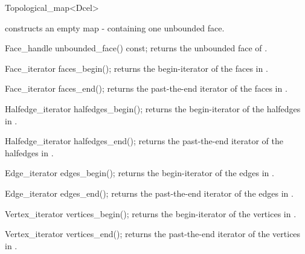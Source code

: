 \begin{ccRefClass}{Topological_map<Dcel>}
    \ccGlue
    \ccGlue    
    \ccGlue    
    
\ccCreation
    
     {constructs an
       empty map - containing one unbounded face.}

    
\ccAccessFunctions

    \ccMethod
    {Face_handle  unbounded_face() const;}
    {returns the unbounded face of \ccVar .}
  
    \ccMethod
    { Face_iterator faces_begin(); }
    { returns the begin-iterator of the faces in \ccVar .}
    
    \ccMethod
    { Face_iterator faces_end(); }
    { returns the past-the-end iterator of the faces in \ccVar .}
    
    \ccMethod
    { Halfedge_iterator halfedges_begin(); }
    { returns the begin-iterator of the halfedges in \ccVar .}
 
    \ccMethod
    { Halfedge_iterator halfedges_end(); }
    { returns the past-the-end iterator of the halfedges in \ccVar .}

    \ccMethod
    { Edge_iterator edges_begin(); }
    { returns the begin-iterator of the edges in \ccVar .}
 
    \ccMethod
    { Edge_iterator edges_end(); }
    { returns the past-the-end iterator of the edges in \ccVar .}
    
    \ccMethod
    { Vertex_iterator vertices_begin(); }
    { returns the begin-iterator of the vertices in \ccVar .}
    
    \ccMethod
    { Vertex_iterator vertices_end(); }
    { returns the past-the-end iterator of the vertices in \ccVar .}


\end{ccRefClass}

